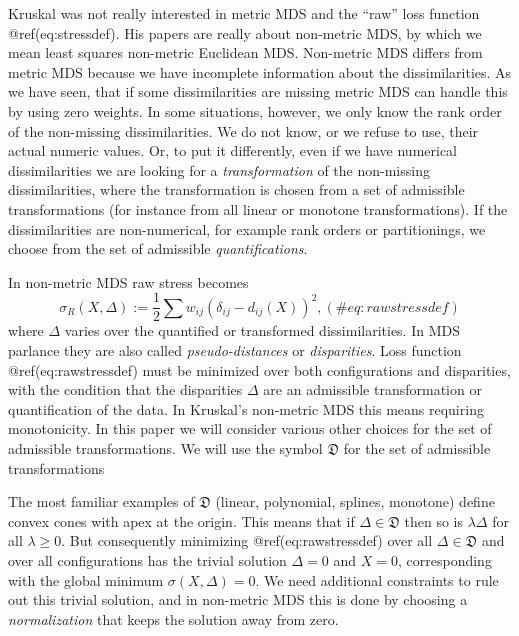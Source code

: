 \documentclass[
  12pt,
  letterpaper,
  DIV=11,
  numbers=noendperiod]{scrartcl}
\begin{document}
Kruskal was not really interested in metric MDS and the ``raw'' loss
function @ref(eq:stressdef). His papers are really about non-metric MDS,
by which we mean least squares non-metric Euclidean MDS. Non-metric MDS
differs from metric MDS because we have incomplete information about the
dissimilarities. As we have seen, that if some dissimilarities are
missing metric MDS can handle this by using zero weights. In some
situations, however, we only know the rank order of the non-missing
dissimilarities. We do not know, or we refuse to use, their actual
numeric values. Or, to put it differently, even if we have numerical
dissimilarities we are looking for a \emph{transformation} of the
non-missing dissimilarities, where the transformation is chosen from a
set of admissible transformations (for instance from all linear or
monotone transformations). If the dissimilarities are non-numerical, for
example rank orders or partitionings, we choose from the set of
admissible \emph{quantifications}.

In non-metric MDS raw stress becomes \begin{equation}
\sigma_R(X,\Delta):=\frac12\sum w_{ij}(\delta_{ij}-d_{ij}(X))^2,
(\#eq:rawstressdef)
\end{equation} where \(\Delta\) varies over the quantified or
transformed dissimilarities. In MDS parlance they are also called
\emph{pseudo-distances} or \emph{disparities}. Loss function
@ref(eq:rawstressdef) must be minimized over both configurations and
disparities, with the condition that the disparities \(\Delta\) are an
admissible transformation or quantification of the data. In Kruskal's
non-metric MDS this means requiring monotonicity. In this paper we will
consider various other choices for the set of admissible
transformations. We will use the symbol \(\mathfrak{D}\) for the set of
admissible transformations

The most familiar examples of \(\mathfrak{D}\) (linear, polynomial,
splines, monotone) define convex cones with apex at the origin. This
means that if \(\Delta\in\mathfrak{D}\) then so is \(\lambda\Delta\) for
all \(\lambda\geq 0\). But consequently minimizing @ref(eq:rawstressdef)
over all \(\Delta\in\mathfrak{D}\) and over all configurations has the
trivial solution \(\Delta=0\) and \(X=0\), corresponding with the global
minimum \(\sigma(X,\Delta)=0\). We need additional constraints to rule
out this trivial solution, and in non-metric MDS this is done by
choosing a \emph{normalization} that keeps the solution away from zero.
\end{document}

